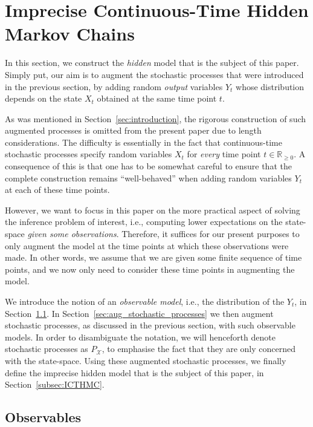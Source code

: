 \documentclass[twoside,11pt]{article}
\newcommand{\reals}{\mathbb{R}}
\newcommand{\realsnonneg}{\reals_{\geq 0}}
\newcommand{\states}{\mathcal{X}}
\begin{document}
\section{Imprecise Continuous-Time Hidden Markov Chains}\label{sec:icthmc}

In this section, we construct the \emph{hidden} model that is the subject of this paper. Simply put, our aim is to augment the stochastic processes that were introduced in the previous section, by adding random \emph{output} variables $Y_t$ whose distribution depends on the state $X_t$ obtained at the same time point $t$.

As was mentioned in Section~\ref{sec:introduction}, the rigorous construction of such augmented processes is omitted from the present paper due to length considerations. The difficulty is essentially in the fact that continuous-time stochastic processes specify random variables $X_t$ for \emph{every} time point $t\in\realsnonneg$. A consequence of this is that one has to be somewhat careful to ensure that the complete construction remains ``well-behaved'' when adding random variables $Y_t$ at each of these time points.

However, we want to focus in this paper on the more practical aspect of solving the inference problem of interest, i.e., computing lower expectations on the state-space \emph{given some observations}. Therefore, it suffices for our present purposes to only augment the model at the time points at which these observations were made. In other words, we assume that we are given some finite sequence of time points, and we now only need to consider these time points in augmenting the model.

We introduce the notion of an \emph{observable model}, i.e., the distribution of the $Y_t$, in Section~\ref{sec:observs}. In Section~\ref{sec:aug_stochastic_processes} we then augment stochastic processes, as discussed in the previous section, with such observable models. In order to disambiguate the notation, we will henceforth denote stochastic processes as $P_\states$, to emphasise the fact that they are only concerned with the state-space. Using these augmented stochastic processes, we finally define the imprecise hidden model that is the subject of this paper, in Section~\ref{subsec:ICTHMC}.

\subsection{Observables}\label{sec:observs}
\end{document}
